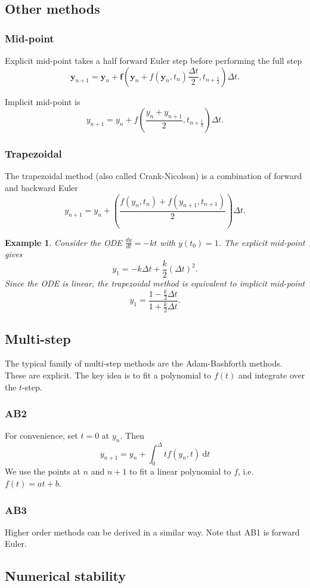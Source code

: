 \documentclass[11pt, a4paper]{article}
\theoremstyle{break}
\newtheorem{eg}[thm]{Example}
\newcommand*{\Paren}[1]{\left(#1\right)}%
\newcommand{\ve}{\mathbf} %
\newcommand{\dt}{\Delta t}
\newcommand{\dder}[2]{\frac{d #1}{d #2}}
\newcommand{\dd}{\ \mathrm{d}}
\begin{document}
\subsection{Other methods}
\subsubsection{Mid-point}
Explicit mid-point takes a half forward Euler step before performing the full step
\[\ve y_{n+1}=\ve y_n + \ve f\Paren{\ve y_n+f(\ve y_n,t_n)\frac{\dt}2,t_{n+\frac12}}\dt.\]

Implicit mid-point is \[y_{n+1}	=y_n+f\Paren{\frac{y_n+y_{n+1}}{2},t_{n+\frac12}}\dt.\]
\subsubsection{Trapezoidal}
The trapezoidal method (also called Crank-Nicolson) is a combination of forward and backward Euler \[y_{n+1}=y_n+\Paren{\frac{f(y_n,t_n)+f(y_{n+1},t_{n+1})}{2}}\dt.\]

\begin{eg}
Consider the ODE $\dder yt=-kt$ with $y(t_0)=1$. The explicit mid-point gives \[y_1=-k\dt+\frac{k}{2}(\dt)^2.\] Since the ODE is linear, the trapezoidal method is equivalent to implicit mid-point \[y_1=\frac{1-\frac k2\dt}{1+\frac k2\dt}.\]
\end{eg}

\subsection{Multi-step}
The typical family of multi-step methods are the Adam-Bashforth methods. These are explicit. The key idea is to fit a polynomial to $f(t)$ and integrate over the $t$-step.
\subsubsection{AB2}
For convenience, set $t=0$ at $y_n$. Then \[y_{n+1}=y_n+\int_0^\dt f(y_n,t)\dd t\]
 We use the points at $n$ and $n+1$ to fit a linear polynomial to $f$, i.e. $f(t)=at+b$.
\subsubsection{AB3}

Higher order methods can be derived in a similar way. Note that AB1 is forward Euler.

\subsection{Numerical stability}
\end{document}
